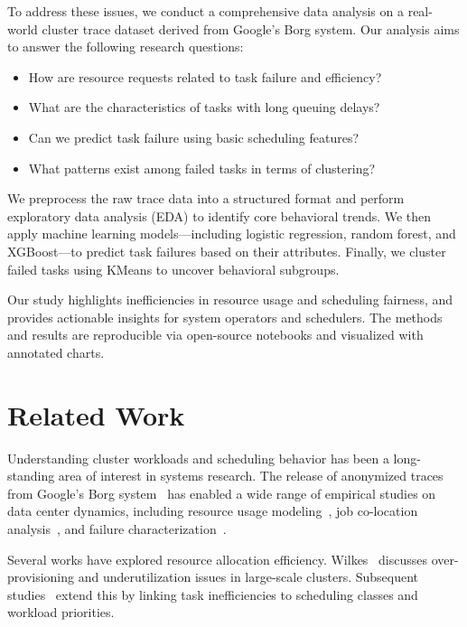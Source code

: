 \documentclass[a4paper,12pt]{article}
\begin{document}
To address these issues, we conduct a comprehensive data analysis on a real-world cluster trace dataset derived from Google's Borg system. Our analysis aims to answer the following research questions:

\begin{itemize}
  \item How are resource requests related to task failure and efficiency?
  \item What are the characteristics of tasks with long queuing delays?
  \item Can we predict task failure using basic scheduling features?
  \item What patterns exist among failed tasks in terms of clustering?
\end{itemize}

We preprocess the raw trace data into a structured format and perform exploratory data analysis (EDA) to identify core behavioral trends. We then apply machine learning models—including logistic regression, random forest, and XGBoost—to predict task failures based on their attributes. Finally, we cluster failed tasks using KMeans to uncover behavioral subgroups.

Our study highlights inefficiencies in resource usage and scheduling fairness, and provides actionable insights for system operators and schedulers. The methods and results are reproducible via open-source notebooks and visualized with annotated charts.

\section{Related Work}

Understanding cluster workloads and scheduling behavior has been a long-standing area of interest in systems research. The release of anonymized traces from Google's Borg system~\cite{reiss2012heterogeneity} has enabled a wide range of empirical studies on data center dynamics, including resource usage modeling~\cite{wilkes2011more}, job co-location analysis~\cite{verma2015large}, and failure characterization~\cite{qin2017analyzing}.

Several works have explored resource allocation efficiency. Wilkes~\cite{wilkes2011more} discusses over-provisioning and underutilization issues in large-scale clusters. Subsequent studies~\cite{chen2019understanding, hindman2011mesos} extend this by linking task inefficiencies to scheduling classes and workload priorities.
\end{document}
